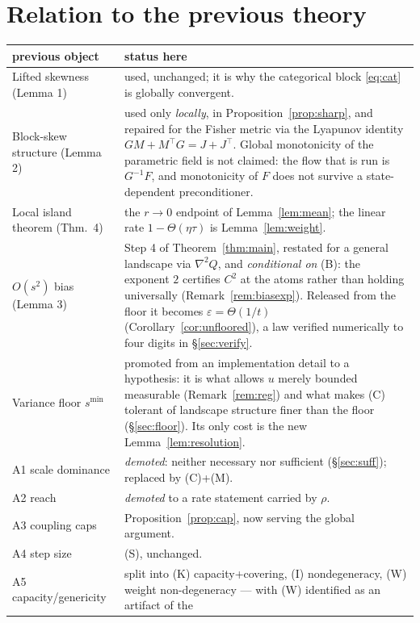 \documentclass[11pt]{article}
\theoremstyle{definition}
\begin{document}
\section{Relation to the previous theory}

\begin{center}
\begin{tabular}{p{} p{}}
\hline
previous object & status here\\
\hline
Lifted skewness (Lemma 1) & used, unchanged; it is why the categorical block
  \eqref{eq:cat} is globally convergent.\\
Block-skew structure (Lemma 2) & used only \emph{locally}, in
  Proposition~\ref{prop:sharp}, and repaired for the Fisher metric via the
  Lyapunov identity $GM + M^\top G = J + J^\top$. Global monotonicity of the
  parametric field is not claimed: the flow that is run is $G^{-1}F$, and
  monotonicity of $F$ does not survive a state-dependent preconditioner.\\
Local island theorem (Thm.\ 4) & the $r \to 0$ endpoint of
  Lemma~\ref{lem:mean}; the linear rate $1 - \Theta(\eta\tau)$ is
  Lemma~\ref{lem:weight}.\\
$O(s^2)$ bias (Lemma 3) & Step 4 of Theorem~\ref{thm:main}, restated for a
  general landscape via $\nabla^2 Q$, and \emph{conditional on} (B): the
  exponent $2$ certifies $C^2$ at the atoms rather than holding universally
  (Remark~\ref{rem:biasexp}). Released from the floor it becomes
  $\varepsilon = \Theta(1/t)$ (Corollary~\ref{cor:unfloored}), a law verified numerically to four digits in
\S\ref{sec:verify}.\\
Variance floor $s^{\min}$ & promoted from an implementation detail to a
  hypothesis: it is what allows $u$ merely bounded measurable
  (Remark~\ref{rem:reg}) and what makes (C) tolerant of landscape structure
  finer than the floor (§\ref{sec:floor}). Its only cost is the new
  Lemma~\ref{lem:resolution}.\\
A1 scale dominance & \emph{demoted}: neither necessary nor sufficient
  (§\ref{sec:suff}); replaced by (C)+(M).\\
A2 reach & \emph{demoted} to a rate statement carried by $\rho$.\\
A3 coupling caps & Proposition~\ref{prop:cap}, now serving the global argument.\\
A4 step size & (S), unchanged.\\
A5 capacity/genericity & split into (K) capacity+covering, (I) nondegeneracy,
  (W) weight non-degeneracy --- with (W) identified as an artifact of the

\end{tabular}
\end{center}
\end{document}

